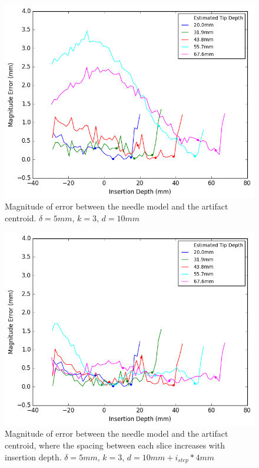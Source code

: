 \begin{figure}[h]
\includegraphics[width=1.0\textwidth]{Fig/chap5/error_curve_3_10.png}
\caption{Magnitude of error between the needle model and the artifact centroid. $\delta=5mm$, $k=3$, $d=10mm$}
\label{fig:curve_errors_fixed_spacing}
\end{figure}

\begin{figure}[h]
\includegraphics[width=1.0\textwidth]{Fig/chap5/error_curve_3_var.png}
\caption{Magnitude of error between the needle model and the artifact centroid, where the spacing between each slice increases with insertion depth.  $\delta=5mm$, $k=3$, $d=10mm + i_{step}*4mm$}
\label{fig:curve_errors_variable_spacing}
\end{figure}



